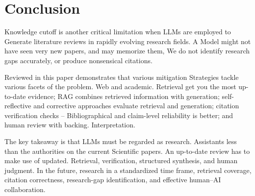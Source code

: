 \documentclass[acmsmall,screen]{acmart}
\begin{document}
\section{Conclusion}

Knowledge cutoff is another critical limitation when LLMs are employed to
Generate literature reviews in rapidly evolving research fields. A
Model might not have seen very new papers, and may memorize them,
We do not identify research gaps accurately, or produce nonsensical citations.

Reviewed in this paper demonstrates that various mitigation
Strategies tackle various facets of the problem. Web and academic.
Retrieval get you the most up-to-date evidence; RAG combines retrieved
information with generation; self-reflective and corrective approaches
evaluate retrieval and generation; citation verification checks
– Bibliographical and claim-level reliability is better; and human review with backing.
Interpretation.

The key takeaway is that LLMs must be regarded as research.
Assistants less than the authorities on the current
Scientific papers. An up-to-date review has to make use of updated.
Retrieval, verification, structured synthesis, and human judgment.
In the future, research in a standardized time frame,
retrieval coverage, citation correctness, research-gap identification,
and effective human--AI collaboration.




\end{document}

